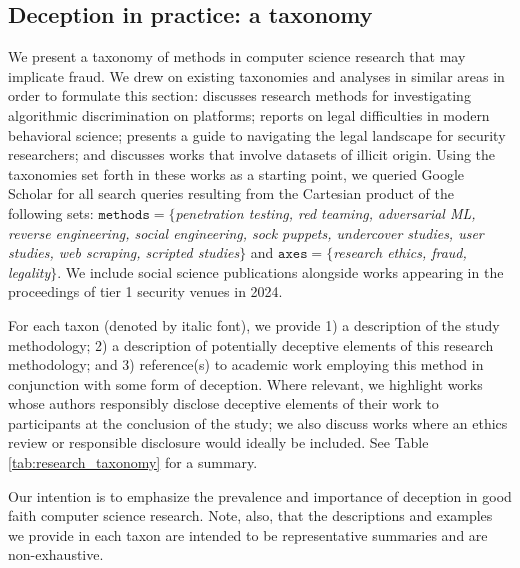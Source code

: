 \subsection{Deception in practice: a taxonomy}
\label{sec:taxonomy}

We present a taxonomy of methods in computer science research that may implicate fraud. We drew on existing taxonomies and analyses in similar areas in order to formulate this section: \cite{sandvig2014} discusses research methods for investigating algorithmic discrimination on platforms; \cite{gilbert2024risks} reports on legal difficulties in modern behavioral science; \cite{parkResearchersGuideLegal} presents a guide to navigating the legal landscape for security researchers; and
\cite{thomasEthicalIssuesResearch2017} discusses works that involve datasets of illicit origin.
Using the taxonomies set forth in these works as a starting point, we queried Google Scholar for all search queries resulting from the Cartesian product of the following sets: $\texttt{methods} = \lbrace$\textit{penetration testing, red teaming, adversarial ML, reverse engineering, social engineering, sock puppets, undercover studies, user studies, web scraping, scripted studies}$\rbrace$ and $\texttt{axes} = \lbrace$\textit{research ethics, fraud, legality}$\rbrace$. We include social science publications alongside works appearing in the proceedings of tier 1 security venues in 2024.

For each taxon (denoted by italic font), we provide 1) a description of the study methodology; 2) a description of potentially deceptive elements of this research methodology; and 3) reference(s) to academic work employing this method in conjunction with some form of deception. Where relevant, we highlight works whose authors responsibly disclose deceptive elements of their work to participants at the conclusion of the study; we also discuss works where an ethics review or responsible disclosure would ideally be included. See Table \ref{tab:research_taxonomy} for a summary.

Our intention is to emphasize the prevalence and importance of deception in good faith computer science research. 
Note, also, that the descriptions and examples we provide in each taxon are intended to be representative summaries and are non-exhaustive. 


